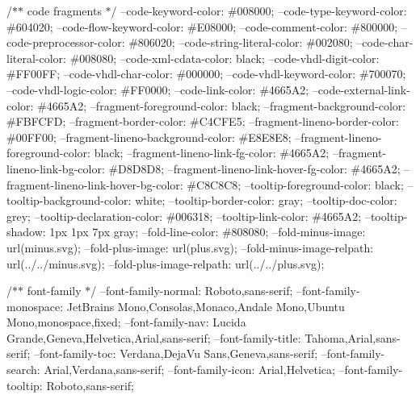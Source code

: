/\texorpdfstring{$\ast$}{*}\texorpdfstring{$\ast$}{*} code fragments \texorpdfstring{$\ast$}{*}/ --code-\/keyword-\/color\+: \#008000; --code-\/type-\/keyword-\/color\+: \#604020; --code-\/flow-\/keyword-\/color\+: \#\+E08000; --code-\/comment-\/color\+: \#800000; --code-\/preprocessor-\/color\+: \#806020; --code-\/string-\/literal-\/color\+: \#002080; --code-\/char-\/literal-\/color\+: \#008080; --code-\/xml-\/cdata-\/color\+: black; --code-\/vhdl-\/digit-\/color\+: \#\+FF00\+FF; --code-\/vhdl-\/char-\/color\+: \#000000; --code-\/vhdl-\/keyword-\/color\+: \#700070; --code-\/vhdl-\/logic-\/color\+: \#\+FF0000; --code-\/link-\/color\+: \#4665A2; --code-\/external-\/link-\/color\+: \#4665A2; --fragment-\/foreground-\/color\+: black; --fragment-\/background-\/color\+: \#\+FBFCFD; --fragment-\/border-\/color\+: \#\+C4\+CFE5; --fragment-\/lineno-\/border-\/color\+: \#00FF00; --fragment-\/lineno-\/background-\/color\+: \#\+E8\+E8\+E8; --fragment-\/lineno-\/foreground-\/color\+: black; --fragment-\/lineno-\/link-\/fg-\/color\+: \#4665A2; --fragment-\/lineno-\/link-\/bg-\/color\+: \#\+D8\+D8\+D8; --fragment-\/lineno-\/link-\/hover-\/fg-\/color\+: \#4665A2; --fragment-\/lineno-\/link-\/hover-\/bg-\/color\+: \#\+C8\+C8\+C8; --tooltip-\/foreground-\/color\+: black; --tooltip-\/background-\/color\+: white; --tooltip-\/border-\/color\+: gray; --tooltip-\/doc-\/color\+: grey; --tooltip-\/declaration-\/color\+: \#006318; --tooltip-\/link-\/color\+: \#4665A2; --tooltip-\/shadow\+: 1px 1px 7px gray; --fold-\/line-\/color\+: \#808080; --fold-\/minus-\/image\+: url(\textquotesingle{}minus.\+svg\textquotesingle{}); --fold-\/plus-\/image\+: url(\textquotesingle{}plus.\+svg\textquotesingle{}); --fold-\/minus-\/image-\/relpath\+: url(\textquotesingle{}../../minus.svg\textquotesingle{}); --fold-\/plus-\/image-\/relpath\+: url(\textquotesingle{}../../plus.svg\textquotesingle{});

/\texorpdfstring{$\ast$}{*}\texorpdfstring{$\ast$}{*} font-\/family \texorpdfstring{$\ast$}{*}/ --font-\/family-\/normal\+: Roboto,sans-\/serif; --font-\/family-\/monospace\+: \textquotesingle{}Jet\+Brains Mono\textquotesingle{},Consolas,Monaco,\textquotesingle{}Andale Mono\textquotesingle{},\textquotesingle{}Ubuntu Mono\textquotesingle{},monospace,fixed; --font-\/family-\/nav\+: \textquotesingle{}Lucida Grande\textquotesingle{},Geneva,Helvetica,Arial,sans-\/serif; --font-\/family-\/title\+: Tahoma,Arial,sans-\/serif; --font-\/family-\/toc\+: Verdana,\textquotesingle{}Deja\+Vu Sans\textquotesingle{},Geneva,sans-\/serif; --font-\/family-\/search\+: Arial,Verdana,sans-\/serif; --font-\/family-\/icon\+: Arial,Helvetica; --font-\/family-\/tooltip\+: Roboto,sans-\/serif;

